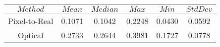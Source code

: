 \begin{table}[h]
\centering
\begin{tabular}{|c|c|c|c|c|c|}
\hline
$Method$ & $Mean$ & $Median$ & $Max$ & $Min$ & $StdDev$ \\
\hline
Pixel-to-Real & 0.1071 & 0.1042 & 0.2248 & 0.0430 & 0.0592 \\
\hline
Optical & 0.2733 & 0.2644 & 0.3981 & 0.1727 & 0.0778 \\
\hline
\end{tabular}
\end{table}
